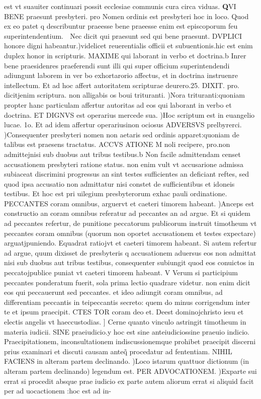 \documentclass{article}
\begin{document}
\begin{pages}
est vt suauiter continuari possit ecclesiae communis cura circa viduas.  \pend\pstart \huge\textbf{Q}\normalsize VI BENE praesunt presbyteri. pro Nomen ordinis est presbyteri hoc in loco. Quod ex eo patet q describuntur praeesse bene praeesse enim est episcoporum feu superintendentium.  Nec dicit qui praesunt sed qui bene praesunt. DVPLICI honore digni habeantur.)videlicet reuerentialis officii et subuentionis.hic est enim duplex honor in scripturis. MAXIME qui laborant in verbo et doctrina.b Inrer bene praesidenres praeferendi sunt illi qui super officium superintendendi adiungunt laborem in ver bo exhortarorio affectus, et in doctrina instruenre intellectum. Et ad hoc affert autoritatem scripturae deurero.25. DIXIT. pro. dicitjenim scriptura. non alligabis os boui trituranti. )Nora trituranti:quoniam propter hanc particulam affertur autoritas ad eos qui laborant in verbo et doctrina. ET DIGNVS est operarius mercede sua. )Hoc scriptum est in euangelio lucae. 1o. Et ad idem affertur operariusinon ociosus ADVERSVS prelbyrerci. )Consequenter presbyteri nomen non aetaris sed ordinis apparet:quoniam de talibus est praesens tractatus. ACCVS ATIONE M noli recipere, pro.non admittejnisi sub duobus aut tribus testibus.b Non facile admittendam censet accusationem presbyteri ratione status. non enim vult vt accusarione admissa subiaceat discrimini progressus an sint testes sufficientes an deficiant reftes, sed quod ipsa accusatio non admittatur nisi constet de sufficientibus et idoneis testibus. Et hoc est pri uilegium presbyterorum exhac pauli ordinatione. PECCANTES coram omnibus, arguervt et caeteri timorem habeant. )Anceps est constructio an coram omnibus referatur ad peccantes an ad argue. Et si quidem ad peccantes refertur, de punitione peccatorum publicorum instruit timotheum vt peccantes coram omnibus (quorum non oportet accusationem et testes expectare) arguatjpuniendo. Equadrat ratiojvt et caeteri timorem habeant. Si autem refertur ad argue, quum dixisset de presbyteris q accusationem aduersus eos non admittat nisi sub duobus aut tribus testibus, consequenter subiungit quod eos conuictos in peccatojpublice puniat vt caeteri timorem habeant. V Verum si participium peccantes ponderatum fuerit, sola prima lectio quadrare videtur. non enim dicit eos qui peccauerunt sed peccantes. et ideo adiungit coram omnibus, ad differentiam peccantis in teipeccantis secreto: quem do minus corrigendum inter te et ipsum praecipit. CTES TOR coram deo et. Deest dominojchristo iesu et electis angelis vt haeccustodias. ] Cerne quanto vinculo astringit timotheum in materia iudicii. SINE praeiudicio.y hoc est sine anteiudiciossine praeuio indicio. Praecipitationem, inconsultationem indiscussionemque prohibet praecipit discerni prius examinari et discuti causam anteq̃ procedatur ad fententiam. NIHIL FACIENS in alteram partem declinando. )Loco istarum quattuor dictionum (in alteram partem declinando) legendum est. PER ADVOCATIONEM. )Exparte sui errat si procedit absque prae iudicio ex parte autem aliorum errat si aliquid facit per ad uocactionem :hoc est ad in-\pend 

\end{pages}
\end{document}
